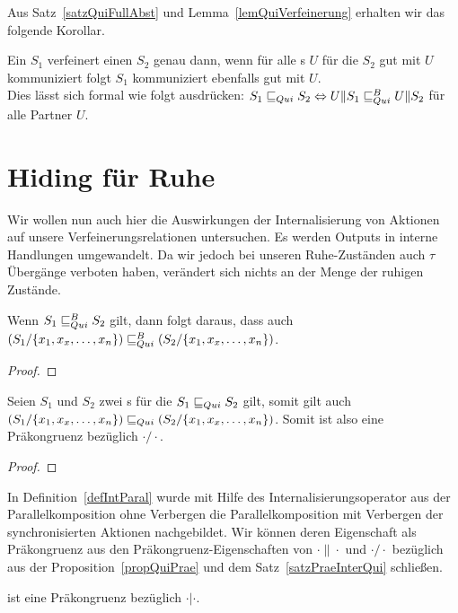 Aus Satz~\ref{satzQuiFullAbst} und Lemma~\ref{lemQuiVerfeinerung} erhalten wir
das folgende Korollar.

\begin{kor}
  Ein \EIO{} $S_1$ verfeinert einen \EIO{} $S_2$ genau dann, wenn für alle
  \EIO{}s $U$ für die $S_2$ gut mit $U$ kommuniziert folgt $S_1$ kommuniziert
  ebenfalls gut mit $U$.\\
  Dies lässt sich formal wie folgt ausdrücken: $S_1\sqsubseteq _{Qui} S_2\Leftrightarrow
  U\|S_1\sqsubseteq _{Qui}^B U\|S_2$ für alle Partner $U$.
\end{kor}

\section{Hiding für Ruhe}

Wir wollen nun auch hier die Auswirkungen der Internalisierung von Aktionen auf
unsere Verfeinerungsrelationen untersuchen. Es werden Outputs in interne
Handlungen umgewandelt. Da wir jedoch bei unseren Ruhe-Zuständen auch $\tau$
Übergänge verboten haben, verändert sich nichts an der Menge der ruhigen
Zustände.\\

\begin{prop}
  Wenn $S_1 \sqsubseteq _{Qui}^B S_2$ gilt, dann folgt daraus, dass auch
  $(S_1/\{x_1,x_x,\dots ,x_n\})\sqsubseteq _{Qui}^B (S_2/\{x_1,x_x,\dots ,x_n\})$.
\end{prop}

\begin{proof}
\end{proof}

\begin{satz}
  \label{satzPraeInterQui}
  Seien $S_1$ und $S_2$ zwei \EIO{}s für die $S_1\sqsubseteq _{Qui} S_2$ gilt, somit gilt
  auch $(S_1/\{x_1,x_x,\dots ,x_n\})\sqsubseteq _{Qui} (S_2/\{x_1,x_x,\dots ,x_n\})$. Somit
  ist also \QRel{} eine Präkongruenz bezüglich $\cdot /\cdot$.
\end{satz}

\begin{proof}
\end{proof}

In Definition~\ref{defIntParal} wurde mit Hilfe des Internalisierungsoperator
aus der Parallelkomposition ohne Verbergen die Parallelkomposition mit
Verbergen der synchronisierten Aktionen nachgebildet. Wir können deren
Eigenschaft als Präkongruenz aus den Präkongruenz-Eigenschaften von
$\cdot\|\cdot$ und $\cdot /\cdot$ bezüglich \QRel{} aus der
Proposition~\ref{propQuiPrae} und dem Satz~\ref{satzPraeInterQui} schließen.

\begin{kor}
  \QRel{} ist eine Präkongruenz bezüglich $\cdot |\cdot$.
\end{kor}
